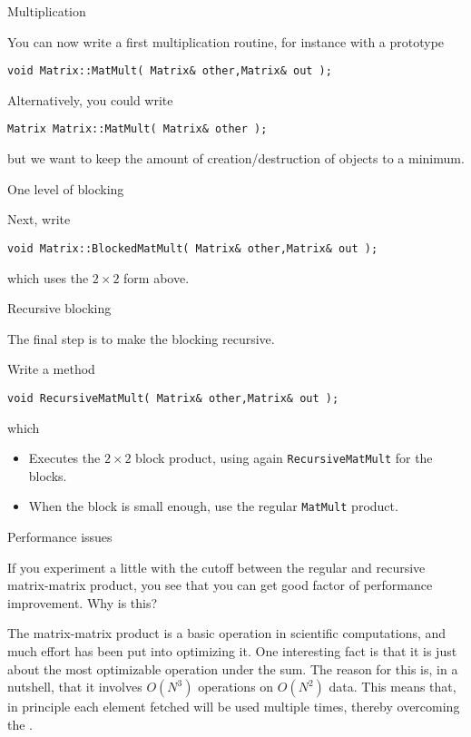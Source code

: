  {Multiplication}

You can now write a first multiplication routine, for instance with a prototype
\begin{lstlisting}
void Matrix::MatMult( Matrix& other,Matrix& out );
\end{lstlisting}

Alternatively, you could write
\begin{lstlisting}
Matrix Matrix::MatMult( Matrix& other );
\end{lstlisting}
but we want to keep the amount of creation/destruction of objects to a minimum.

 {One level of blocking}

Next, write
\begin{lstlisting}
void Matrix::BlockedMatMult( Matrix& other,Matrix& out );
\end{lstlisting}
which uses the $2\times2$ form above.

 {Recursive blocking}

The final step is to make the blocking recursive.

\begin{exercise}
  Write a method
\begin{lstlisting}
void RecursiveMatMult( Matrix& other,Matrix& out );
\end{lstlisting}
  which 
  \begin{itemize}
  \item Executes the $2\times2$ block product, using again
    \lstinline{RecursiveMatMult} for the blocks.
  \item When the block is small enough, use the regular
    \lstinline{MatMult} product.
  \end{itemize}
\end{exercise}

 {Performance issues}

If you experiment a little with the cutoff between the regular and
recursive matrix-matrix product, you see that you can get good factor
of performance improvement. Why is this?

The matrix-matrix product is a basic operation in scientific
computations, and much effort has been put into optimizing it. One
interesting fact is that it is just about the most optimizable
operation under the sum. The reason for this is, in a nutshell, that
it involves $O(N^3)$ operations on $O(N^2)$ data. This means that, in
principle each element fetched will be used multiple times, thereby
overcoming the .

